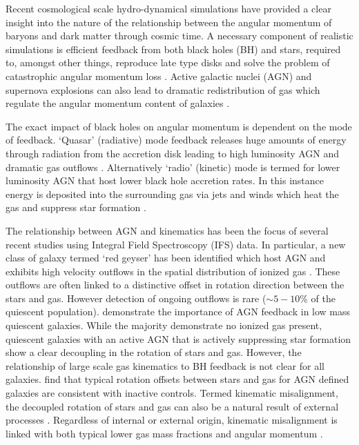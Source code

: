 \documentclass[fleqn,usenatbib]{mnras}
\begin{document}
Recent cosmological scale hydro-dynamical simulations have provided a clear insight into the nature of the relationship between the angular momentum of baryons and dark matter through cosmic time. A necessary component of realistic simulations is efficient feedback from both black holes (BH) and stars, required to, amongst other things, reproduce late type disks and solve the problem of catastrophic angular momentum loss \citep[e.g.][]{zavala2008, scannapieco2009}. Active galactic nuclei (AGN) and supernova explosions can also lead to dramatic redistribution of gas which regulate the angular momentum content of galaxies \citep[e.g.][]{genel2015, DeFelippis2017}. 

The exact impact of black holes on angular momentum is dependent on the mode of feedback. `Quasar' (radiative) mode feedback releases huge amounts of energy through radiation from the accretion disk leading to high luminosity AGN and dramatic gas outflows \citep[e.g.][]{cattaneo2009, rubin2014, cheung2016}. Alternatively `radio' (kinetic) mode is termed for lower luminosity AGN that host lower black hole accretion rates. In this instance energy is deposited into the surrounding gas via jets and winds which heat the gas and suppress star formation \citep[][]{binney1995, ciotti2001, heckman2014}.

The relationship between AGN and kinematics has been the focus of several recent studies using Integral Field Spectroscopy (IFS) data. In particular, a new class of galaxy termed `red geyser' has been identified which host AGN and exhibits high velocity outflows in the spatial distribution of ionized gas \citep[][]{cheung2016, roy2018}. These outflows are often linked to a distinctive offset in rotation direction between the stars and gas. However detection of ongoing outflows is rare ($\sim5-10$\% of the quiescent population). \citet{penny2018} demonstrate the importance of AGN feedback in low mass quiescent galaxies. While the majority demonstrate no ionized gas present, quiescent galaxies with an active AGN that is actively suppressing star formation show a clear decoupling in the rotation of stars and gas. However, the relationship of large scale gas kinematics to BH feedback is not clear for all galaxies. \citet{ilha2019} find that typical rotation offsets between stars and gas for AGN defined galaxies are consistent with inactive controls. Termed kinematic misalignment, the decoupled rotation of stars and gas can also be a natural result of external processes \cite[e.g.][]{davis2011, barrera2015, vdvoort2015, jin2016}. Regardless of internal or external origin, kinematic misalignment is linked with both typical lower gas mass fractions and angular momentum \citep[e.g. Duckworth et al.,][]{starkenburg+19}. 
\end{document}
